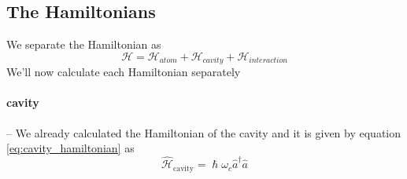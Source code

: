 \subsection{The Hamiltonians} \label{sec:the-hamiltonians}
We separate the Hamiltonian as
\[
    \mathcal{H} = \mathcal{H}_{\textit{atom}} + \mathcal{H}_{\textit{cavity}} + \mathcal{H}_{\textit{interaction}}
\]
We'll now calculate each Hamiltonian separately

\paragraph*{cavity}--\quad
We already calculated the Hamiltonian of the cavity and it is given by equation \ref{eq:cavity_hamiltonian} as
\begin{equation}
    \boxed{\hat{\mathcal{H}}_{\text{cavity}} = \hslash\omega_c\hat{a}^\dag\hat{a}}
\end{equation}



